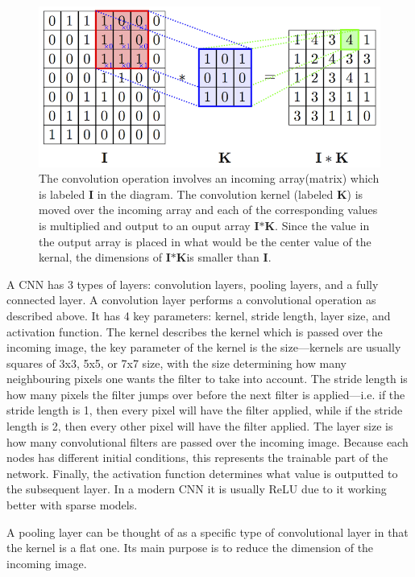 \documentclass[a4paper,fleqn,usenatbib]{mnras}
\begin{document}
\begin{figure}
\includegraphics[width=\columnwidth]{../Figures/convolution}
\caption{The convolution operation involves an incoming array(matrix) which is labeled \textbf{I} in the diagram. The convolution kernel (labeled \textbf{K}) is moved over the incoming array and each of the corresponding values is multiplied and output to an ouput array \textbf{I$\ast$K}. Since the value in the output array is placed in what would be the center value of the kernal, the dimensions of \textbf{I$\ast$K}is smaller than \textbf{I}. \protect\citep{convolution}\label{fig:convolution}}
\end{figure}

A CNN has 3 types of layers: convolution layers, pooling layers, and a fully connected layer. A convolution layer performs a convolutional operation as described above. It has 4 key parameters: kernel, stride length, layer size, and activation function. The kernel describes the kernel which is passed over the incoming image, the key parameter of the kernel is the size---kernels are usually squares of 3x3, 5x5, or 7x7 size, with the size determining how many neighbouring pixels one wants the filter to take into account. The stride length is how many pixels the filter jumps over before the next filter is applied---i.e. if the stride length is 1, then every pixel will have the filter applied, while if the stride length is 2, then every other pixel will have the filter applied. The layer size is how many convolutional filters are passed over the incoming image. Because each nodes has different initial conditions, this represents the trainable part of the network. Finally, the activation function determines what value is outputted to the subsequent layer. In a modern CNN it is usually ReLU due to it working better with sparse models. \citep{CNNSparse}

A pooling layer can be thought of as a specific type of convolutional layer in that the kernel is a flat one. Its main purpose is to reduce the dimension of the incoming image. 
\end{document}
